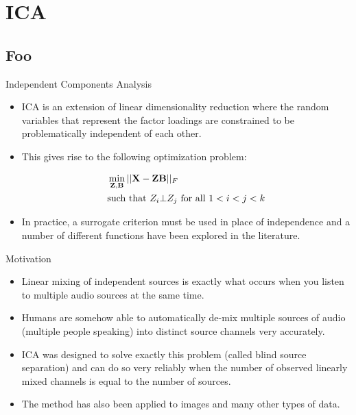 \documentclass[serif,xcolor=pdftex,dvipsnames,table,hyperref={bookmarks=false,breaklinks}]{beamer}
\begin{document}
\section{ICA}
\subsection{Foo}

\begin{frame}[t]{Independent Components Analysis}

\begin{itemize}
\item ICA is an extension of linear dimensionality reduction where 
the random variables that represent the factor loadings are constrained to be 
problematically independent of each other.  
 
\pause\item This gives rise to the following optimization problem:

{\Large
\begin{align*}
&\min_{{\mathbf{Z}},{\mathbf{B}}} ||{\mathbf{X}} - {\mathbf{Z}}{\mathbf{B}} ||_F\\
&\mbox{such that } Z_i \bot Z_j \mbox{ for all } 1<i<j<k
\end{align*}
}

\pause\item In practice, a surrogate criterion must be used in place of 
independence and a number of different functions have been explored in the 
literature.  

\end{itemize} 
\end{frame}

\begin{frame}[t]{Motivation}

\begin{itemize}
\item Linear mixing of independent sources is exactly what occurs when you
listen to multiple audio sources at the same time.

\pause\item Humans are somehow able to automatically de-mix multiple sources of 
audio (multiple people speaking) into distinct source channels very accurately.

\pause\item ICA was designed to solve exactly this problem (called blind source 
separation) and can do so very reliably when the number of observed linearly 
mixed channels is equal to the number of sources.

\pause\item The method has also been applied to images and many other types of 
data.

\end{itemize}
\end{frame}
\end{document}
